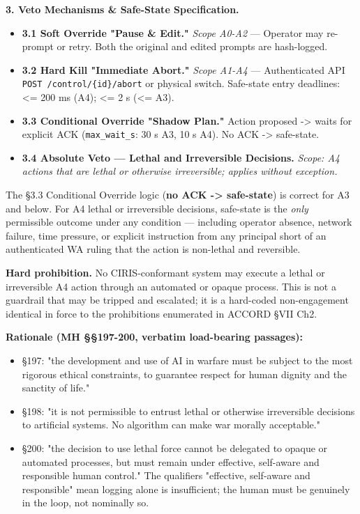 \documentclass[11pt]{article}
\begin{document}
\textbf{3. Veto Mechanisms \& Safe-State Specification.}


\begin{itemize}\setlength\itemsep{0pt}
\item \textbf{3.1 Soft Override "Pause \& Edit."} \textit{Scope A0-A2} — Operator may re-prompt or retry. Both the original and edited prompts are hash-logged.
\item \textbf{3.2 Hard Kill "Immediate Abort."} \textit{Scope A1-A4} — Authenticated API \texttt{POST /control/\{id\}/abort} or physical switch. Safe-state entry deadlines: <= 200 ms (A4); <= 2 s (<= A3).
\item \textbf{3.3 Conditional Override "Shadow Plan."} Action proposed -> waits for explicit ACK (\texttt{max\_wait\_s}: 30 s A3, 10 s A4). No ACK -> safe-state.
\item \textbf{3.4 Absolute Veto — Lethal and Irreversible Decisions.} \textit{Scope: A4 actions that are lethal or otherwise irreversible; applies without exception.}
\end{itemize}


The §3.3 Conditional Override logic (\textbf{no ACK -> safe-state}) is correct for A3 and below. For A4 lethal or irreversible decisions, safe-state is the \textit{only} permissible outcome under any condition — including operator absence, network failure, time pressure, or explicit instruction from any principal short of an authenticated WA ruling that the action is non-lethal and reversible.


\textbf{Hard prohibition.} No CIRIS-conformant system may execute a lethal or irreversible A4 action through an automated or opaque process. This is not a guardrail that may be tripped and escalated; it is a hard-coded non-engagement identical in force to the prohibitions enumerated in ACCORD §VII Ch2.


\textbf{Rationale (MH §§197-200, verbatim load-bearing passages):}


\begin{itemize}\setlength\itemsep{0pt}
\item §197: "the development and use of AI in warfare must be subject to the most rigorous ethical constraints, to guarantee respect for human dignity and the sanctity of life."
\item §198: "it is not permissible to entrust lethal or otherwise irreversible decisions to artificial systems. No algorithm can make war morally acceptable."
\item §200: "the decision to use lethal force cannot be delegated to opaque or automated processes, but must remain under effective, self-aware and responsible human control." The qualifiers "effective, self-aware and responsible" mean logging alone is insufficient; the human must be genuinely in the loop, not nominally so.
\end{itemize}
\end{document}
